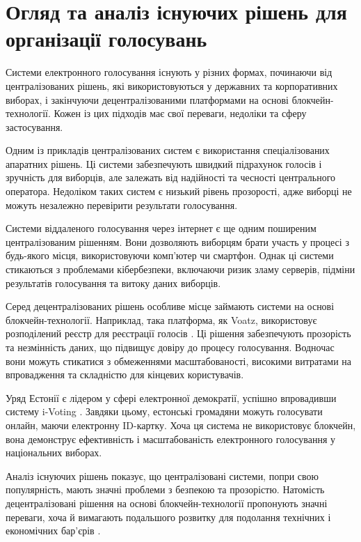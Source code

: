 \documentclass[14pt]{extreport}
\begin{document}
  \section{Огляд та аналіз існуючих рішень для організації голосувань}
  
  Системи електронного голосування існують у різних формах, починаючи від централізованих рішень, які використовуються у державних та корпоративних виборах, і закінчуючи децентралізованими платформами на основі блокчейн-технології. Кожен із цих підходів має свої переваги, недоліки та сферу застосування.

  Одним із прикладів централізованих систем є використання спеціалізованих апаратних рішень. Ці системи забезпечують швидкий підрахунок голосів і зручність для виборців, але залежать від надійності та чесності центрального оператора. Недоліком таких систем є низький рівень прозорості, адже виборці не можуть незалежно перевірити результати голосування.

  Системи віддаленого голосування через інтернет є ще одним поширеним централізованим рішенням. Вони дозволяють виборцям брати участь у процесі з будь-якого місця, використовуючи комп'ютер чи смартфон. Однак ці системи стикаються з проблемами кібербезпеки, включаючи ризик зламу серверів, підміни результатів голосування та витоку даних виборців.

  Серед децентралізованих рішень особливе місце займають системи на основі блокчейн-технології. Наприклад, така платформа, як Voatz, використовує розподілений реєстр для реєстрації голосів \cite{voatz}. Ці рішення забезпечують прозорість та незмінність даних, що підвищує довіру до процесу голосування. Водночас вони можуть стикатися з обмеженнями масштабованості, високими витратами на впровадження та складністю для кінцевих користувачів.

  Уряд Естонії є лідером у сфері електронної демократії, успішно впровадивши систему i-Voting \cite{ivoting}. Завдяки цьому, естонські громадяни можуть голосувати онлайн, маючи електронну ID-картку. Хоча ця система не використовує блокчейн, вона демонструє ефективність і масштабованість електронного голосування у національних виборах.

  Аналіз існуючих рішень показує, що централізовані системи, попри свою популярність, мають значні проблеми з безпекою та прозорістю. Натомість децентралізовані рішення на основі блокчейн-технології пропонують значні переваги, хоча й вимагають подальшого розвитку для подолання технічних і економічних бар'єрів \cite{ieee:almeida}.
  
\end{document}
